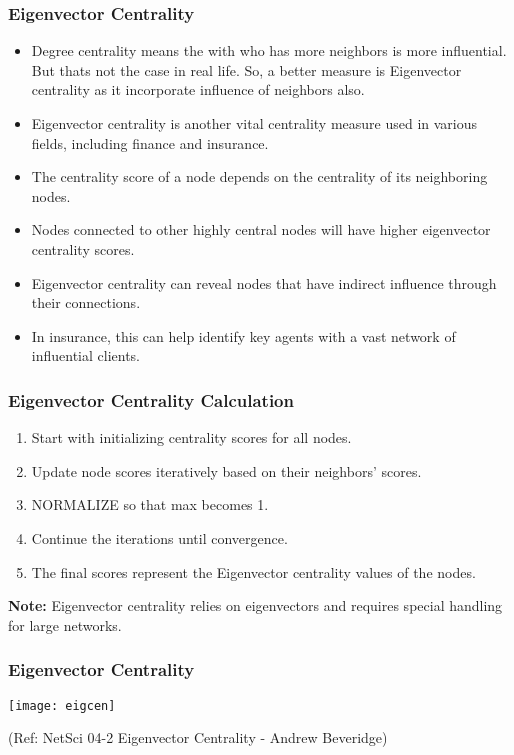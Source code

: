 \begin{frame}[fragile]\frametitle{Eigenvector Centrality}
\begin{itemize}
\item Degree centrality means the with who has more neighbors is more influential. But thats not the case in real life. So, a better measure is Eigenvector centrality as it incorporate influence of neighbors also.
\item Eigenvector centrality is another vital centrality measure used in various fields, including finance and insurance.
\item The centrality score of a node depends on the centrality of its neighboring nodes.
\item Nodes connected to other highly central nodes will have higher eigenvector centrality scores.
\item Eigenvector centrality can reveal nodes that have indirect influence through their connections.
\item In insurance, this can help identify key agents with a vast network of influential clients.
\end{itemize}
\end{frame}

\begin{frame}[fragile]\frametitle{Eigenvector Centrality Calculation}
\begin{enumerate}
\item Start with initializing centrality scores for all nodes.
\item Update node scores iteratively based on their neighbors' scores.
\item NORMALIZE so that max becomes 1.
\item Continue the iterations until convergence.
\item The final scores represent the Eigenvector centrality values of the nodes.
\end{enumerate}

\textbf{Note:} Eigenvector centrality relies on eigenvectors and requires special handling for large networks.
\end{frame}

\begin{frame}[fragile]\frametitle{Eigenvector Centrality}

\begin{center}
\texttt{[image: eigcen]}

{\tiny (Ref: NetSci 04-2 Eigenvector Centrality - Andrew Beveridge)}
\end{center}	  
\end{frame}

